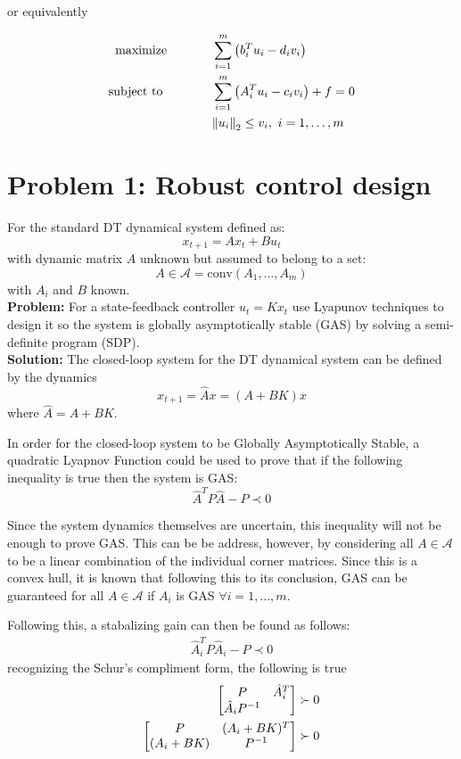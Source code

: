 \documentclass[letter]{article}
\newcommand{\maxpblm}[3][eq:default]{
	\begin{equation}\label{#1}
		\begin{aligned}
			\text{maximize} \hspace{0.5in} &#2\vspace{5pt}\\
			\text{subject to \hspace{0.5in}} &#3
		\end{aligned}	
	\end{equation}
}
\begin{document}
or equivalently
\maxpblm{\sum_{i=1}^m \qty(b_i^T u_i - d_i v_i)}{
	\sum_{i=1}^m \qty(A_i^T u_i - c_i v_i) + f = 0\\
	& \norm{u_i}_2 \leq v_i, \ i = 1,\dots,m}


\newpage
\section{Problem 1: Robust control design}
For the standard DT dynamical system defined as:
\begin{equation}
	x_{t+1} = A x_t + B u_t
\end{equation}
with dynamic matrix $A$ unknown but assumed to belong to a set:
\begin{equation}
	A \in \mathcal{A} = \text{conv}(A_1,\dots,A_m)
\end{equation}
with $A_i$ and $B$ known.\\


\textbf{Problem:}
For a state-feedback controller $u_t = K x_t$ use Lyapunov techniques to design it so the system is globally asymptotically stable (GAS) by solving a semi-definite program (SDP).\\

\textbf{Solution:}
The closed-loop system for the DT dynamical system can be defined by the dynamics
\begin{equation}
	x_{t+1} = \hat{A} x = (A + B K) x
\end{equation}
where $\hat{A} = A + B K$.

In order for the closed-loop system to be Globally Asymptotically Stable, a quadratic Lyapnov Function could be used to prove that if the following inequality is true then the system is GAS:
\begin{equation}
	\hat{A}^T P \hat{A} - P \prec 0
\end{equation}

Since the system dynamics themselves are uncertain, this inequality will not be enough to prove GAS. This can be be address, however, by considering all $A \in \mathcal{A}$ to be a linear combination of the individual corner matrices. Since this is a convex hull, it is known that following this to its conclusion, GAS can be guaranteed for all $A \in \mathcal{A}$ if $A_i$ is GAS $\forall i = 1, \dots, m$.

Following this, a stabalizing gain can then be found as follows:
\begin{align}
	\hat{A}_i^T P \hat{A}_i - P \prec 0
\end{align}
recognizing the Schur's compliment form, the following is true
\begin{align}
	\mqty[P & \hat{A}_i^T\\ \hat{A}_i P^{-1}] \succ 0\\
	\mqty[P & (A_i + B K)^T\\ (A_i + B K) &P^{-1}] \succ 0
\end{align}
\end{document}
